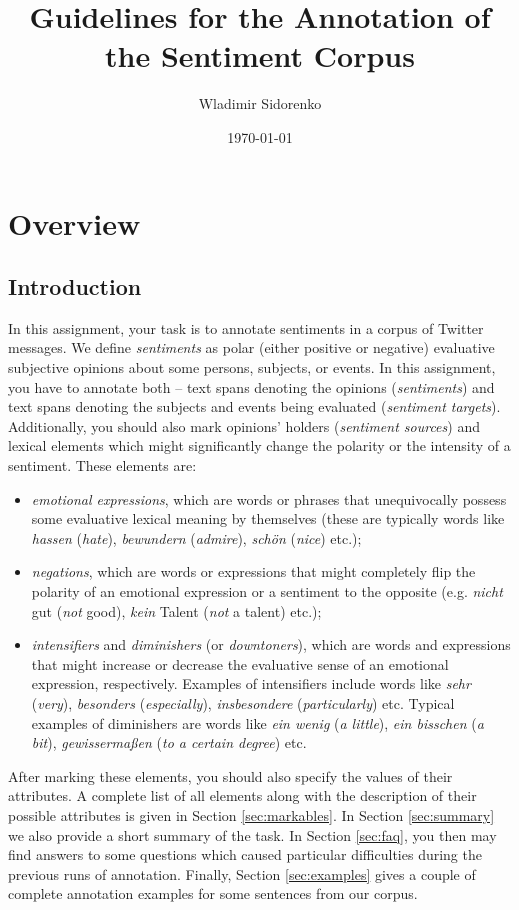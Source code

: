 \documentclass[11pt,a4paper]{article}
\author{Wladimir Sidorenko}
\date{\today}
\title{Guidelines for the Annotation of the Sentiment Corpus}
\theoremstyle{mytheoremstyle}
\begin{document}
\maketitle{}
\section{Overview}
\subsection{Introduction}

In this assignment, your task is to annotate sentiments in a corpus of
Twitter messages.  We define \emph{sentiments} as polar (either
positive or negative) evaluative subjective opinions about some
persons, subjects, or events.  In this assignment, you have to
annotate both -- text spans denoting the opinions (\emph{sentiments})
and text spans denoting the subjects and events being evaluated
(\emph{sentiment targets}).  Additionally, you should also mark
opinions' holders (\emph{sentiment sources}) and lexical elements
which might significantly change the polarity or the intensity of a
sentiment.  These elements are:
\begin{itemize}
  \item \emph{emotional expressions}, which are words or phrases that
    unequivocally possess some evaluative lexical meaning by
    themselves (these are typically words like \emph{hassen}
    (\emph{hate}), \emph{bewundern} (\emph{admire}), \emph{sch\"on}
    (\emph{nice}) etc.);
  \item \emph{negations}, which are words or expressions that might
    completely flip the polarity of an emotional expression or a
    sentiment to the opposite (e.g. \emph{nicht} gut (\emph{not}
    good), \emph{kein} Talent (\emph{not} a talent) etc.);
  \item \emph{intensifiers} and \emph{diminishers} (or
    \emph{downtoners}), which are words and expressions that might
    increase or decrease the evaluative sense of an emotional
    expression, respectively.  Examples of intensifiers include words
    like \emph{sehr} (\emph{very}), \emph{besonders}
    (\emph{especially}), \emph{insbesondere} (\emph{particularly})
    etc.  Typical examples of diminishers are words like \emph{ein
      wenig} (\emph{a little}), \emph{ein bisschen} (\emph{a bit}),
    \emph{gewisserma\ss{}en} (\emph{to a certain degree}) etc.
\end{itemize}

After marking these elements, you should also specify the values of
their attributes.  A complete list of all elements along with the
description of their possible attributes is given in Section
\ref{sec:markables}.  In Section \ref{sec:summary} we also provide a
short summary of the task.  In Section \ref{sec:faq}, you then may
find answers to some questions which caused particular difficulties
during the previous runs of annotation.  Finally, Section
\ref{sec:examples} gives a couple of complete annotation examples for
some sentences from our corpus.
\end{document}
